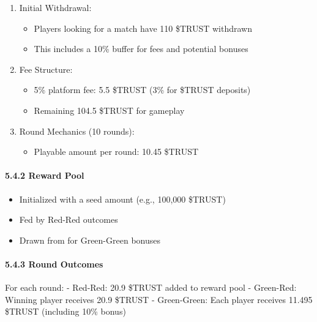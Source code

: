 \documentclass[]{article}
\begin{document}
\begin{enumerate}
\def\labelenumi{\arabic{enumi}.}
\tightlist
\item
  Initial Withdrawal:

  \begin{itemize}
  \tightlist
  \item
    Players looking for a match have 110 \$TRUST withdrawn
  \item
    This includes a 10\% buffer for fees and potential bonuses
  \end{itemize}
\item
  Fee Structure:

  \begin{itemize}
  \tightlist
  \item
    5\% platform fee: 5.5 \$TRUST (3\% for \$TRUST deposits)
  \item
    Remaining 104.5 \$TRUST for gameplay
  \end{itemize}
\item
  Round Mechanics (10 rounds):

  \begin{itemize}
  \tightlist
  \item
    Playable amount per round: 10.45 \$TRUST
  \end{itemize}
\end{enumerate}

\hypertarget{reward-pool}{%
\paragraph{5.4.2 Reward Pool}\label{reward-pool}}

\begin{itemize}
\tightlist
\item
  Initialized with a seed amount (e.g., 100,000 \$TRUST)
\item
  Fed by Red-Red outcomes
\item
  Drawn from for Green-Green bonuses
\end{itemize}

\hypertarget{round-outcomes}{%
\paragraph{5.4.3 Round Outcomes}\label{round-outcomes}}

For each round: - Red-Red: 20.9 \$TRUST added to reward pool -
Green-Red: Winning player receives 20.9 \$TRUST - Green-Green: Each
player receives 11.495 \$TRUST (including 10\% bonus)
\end{document}
